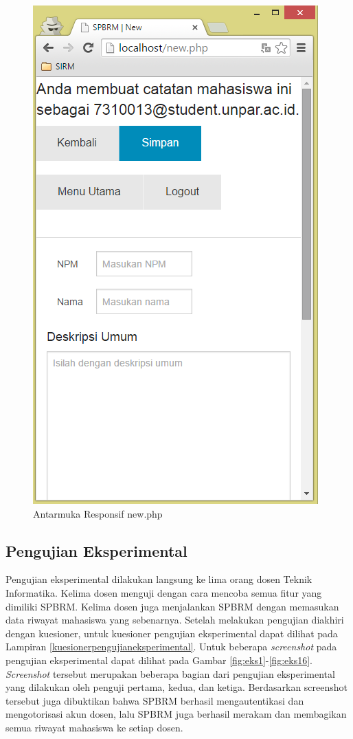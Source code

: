 \begin{figure}[H]
\centering
\includegraphics[scale=0.44]{Gambar/pengujian24.png}
\caption[Antarmuka Responsif new.php]{Antarmuka Responsif new.php} 
\label{fig:responsifnew}
\end{figure}

\subsection{Pengujian Eksperimental}
\label{sec:pengujianeksperimantal}

Pengujian eksperimental dilakukan langsung ke lima orang dosen Teknik Informatika. Kelima dosen menguji dengan cara mencoba semua fitur yang dimiliki SPBRM. Kelima dosen juga menjalankan SPBRM dengan memasukan data riwayat mahasiswa yang sebenarnya. Setelah melakukan pengujian diakhiri dengan kuesioner, untuk kuesioner pengujian eksperimental dapat dilihat pada Lampiran \ref{kuesionerpengujianeksperimental}. Untuk beberapa {\it screenshot} pada pengujian eksperimental dapat dilihat pada Gambar \ref{fig:eks1}-\ref{fig:eks16}. {\it Screenshot} tersebut merupakan beberapa bagian dari pengujian eksperimental yang dilakukan oleh penguji pertama, kedua, dan ketiga. Berdasarkan {screenshot} tersebut juga dibuktikan bahwa SPBRM berhasil mengautentikasi dan mengotorisasi akun dosen, lalu SPBRM juga berhasil merakam dan membagikan semua riwayat mahasiswa ke setiap dosen.

